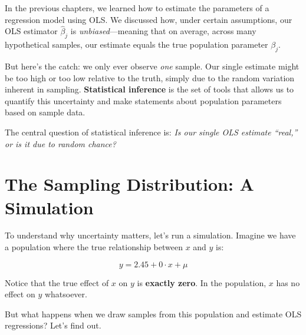 \documentclass[
  letterpaper,
  DIV=11,
  numbers=noendperiod]{scrreprt}
\begin{document}
In the previous chapters, we learned how to estimate the parameters of a
regression model using OLS. We discussed how, under certain assumptions,
our OLS estimator \(\hat{\beta}_j\) is \emph{unbiased}---meaning that on
average, across many hypothetical samples, our estimate equals the true
population parameter \(\beta_j\).

But here's the catch: we only ever observe \emph{one} sample. Our single
estimate might be too high or too low relative to the truth, simply due
to the random variation inherent in sampling. \textbf{Statistical
inference} is the set of tools that allows us to quantify this
uncertainty and make statements about population parameters based on
sample data.

The central question of statistical inference is: \emph{Is our single
OLS estimate ``real,'' or is it due to random chance?}

\section{The Sampling Distribution: A
Simulation}\label{the-sampling-distribution-a-simulation}

To understand why uncertainty matters, let's run a simulation. Imagine
we have a population where the true relationship between \(x\) and \(y\)
is:

\[y = 2.45 + 0 \cdot x + \mu\]

Notice that the true effect of \(x\) on \(y\) is \textbf{exactly zero}.
In the population, \(x\) has no effect on \(y\) whatsoever.

But what happens when we draw samples from this population and estimate
OLS regressions? Let's find out.
\end{document}
